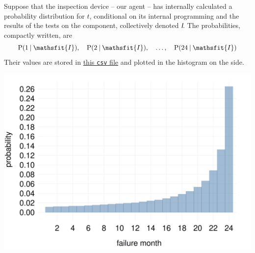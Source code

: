 \documentclass[
  a4paper,
  DIV=11,
  numbers=noendperiod,
  oneside]{scrreprt}
\begin{document}
Suppose that the inspection device -- our agent -- has internally
calculated a probability distribution for \(t\), conditional on its
internal programming and the results of the tests on the component,
collectively denoted {\(\mathsfit{I}\).} The probabilities, compactly
written, are \[
\mathrm{P}(1 \nonscript\:\vert\nonscript\:\mathopen{}\mathsfit{I}), \quad
\mathrm{P}(2 \nonscript\:\vert\nonscript\:\mathopen{}\mathsfit{I}), \quad
\dotsc, \quad
\mathrm{P}(24 \nonscript\:\vert\nonscript\:\mathopen{}\mathsfit{I})
\] Their values are stored in \href{failure_probability.csv}{this
\texttt{csv} file} and plotted in the histogram on the side.

\begin{marginfigure}

{\centering \includegraphics[width=1\textwidth,height=\textheight]{failure_probabilities.png}

}

\end{marginfigure}
\end{document}
